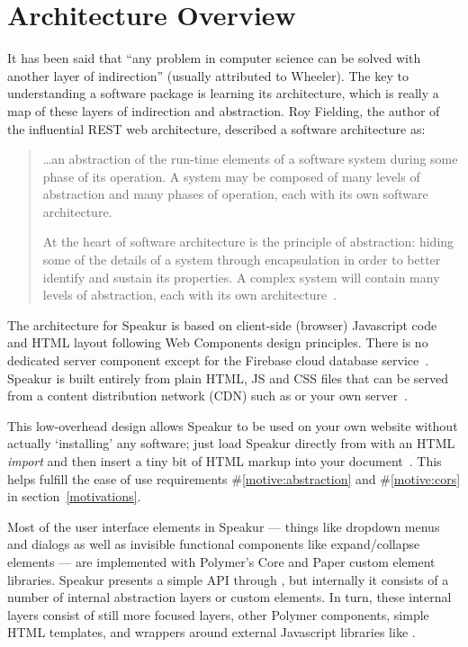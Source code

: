 \section{Architecture Overview}
It has been said that ``any problem in computer science can be solved with another layer of indirection'' (usually attributed to Wheeler).
The key to understanding a software package is learning its architecture,
which is really a map of these layers of indirection and abstraction.
Roy Fielding, the author of the influential REST web architecture, described a software architecture as:

\begin{quote}
\dots an abstraction of the run-time elements of a software system during some phase of its operation. A system may be composed of many levels of abstraction and many phases of operation, each with its own software architecture.

At the heart of software architecture is the principle of abstraction: hiding some of the details of a system through encapsulation in order to better identify and sustain its properties. A complex system will contain many levels of abstraction, each with its own architecture~\cite{fielding2000}.
\end{quote}

The architecture for Speakur is based on client-side (browser) Javascript code and HTML layout following Web Components design principles. 
There is no dedicated server component except for the Firebase cloud database service~\cite{firebasecontributors2015}.
Speakur is built entirely from plain HTML, JS and CSS files that can be served from a content distribution network (CDN) 
such as  or your own server~\cite{landers2015-d}.

This low-overhead design allows Speakur to be used on your own website without actually `installing' any software;
just load Speakur directly from  with an HTML \textit{import}
and then insert a tiny bit of HTML markup into your document~\cite{landers2015-d}.
This helps fulfill the ease of use requirements 
\#\ref{motive:abstraction} and \#\ref{motive:cors}
in section~\ref{motivations}.

Most of the user interface elements in Speakur 
--- things like dropdown menus and dialogs as well as invisible functional components like expand/collapse elements  
--- are implemented with Polymer's Core and Paper custom element libraries.
Speakur presents a simple API through ,
but internally it consists of a number of internal abstraction layers or custom elements.
In turn, these internal layers consist of still more focused layers, other Polymer components, simple HTML templates, and wrappers around external Javascript libraries like  .

